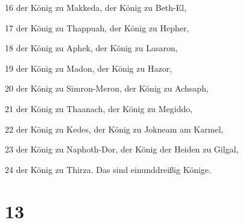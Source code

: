 \par 16 der König zu Makkeda, der König zu Beth-El,
\par 17 der König zu Thappuah, der König zu Hepher,
\par 18 der König zu Aphek, der König zu Lasaron,
\par 19 der König zu Madon, der König zu Hazor,
\par 20 der König zu Simron-Meron, der König zu Achsaph,
\par 21 der König zu Thaanach, der König zu Megiddo,
\par 22 der König zu Kedes, der König zu Jokneam am Karmel,
\par 23 der König zu Naphoth-Dor, der König der Heiden zu Gilgal,
\par 24 der König zu Thirza. Das sind einunddreißig Könige.

\chapter{13}

